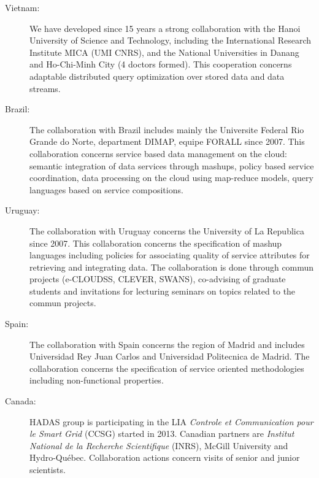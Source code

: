\begin{description}
\item[Vietnam:] We have developed since 15 years a strong collaboration with the Hanoi University of Science and Technology, including the International Research Institute MICA (UMI CNRS), and the National Universities in Danang and Ho-Chi-Minh City (4 doctors formed). This cooperation concerns adaptable distributed query optimization over stored data and data streams. 

\item[Brazil:] 
The collaboration with Brazil includes mainly the Universite Federal Rio Grande do Norte, department DIMAP,  equipe FORALL since 2007. This collaboration concerns service based data management on the cloud: semantic integration of data services through mashups, policy based service coordination, data processing on the cloud using map-reduce models, query languages based on service compositions.  

\item[Uruguay:] 
The collaboration with Uruguay concerns the University of La Republica since 2007. This collaboration concerns the specification of mashup languages including policies for associating quality of service attributes for retrieving and integrating data. The collaboration is done through commun projects (e-CLOUDSS, CLEVER, SWANS), co-advising of graduate students and invitations for lecturing seminars on topics related to the commun projects.

\item[Spain:] 
The collaboration with Spain concerns the region of Madrid and includes Universidad Rey Juan Carlos and Universidad Politecnica de Madrid. The collaboration concerns the specification of service oriented methodologies including non-functional properties. 

\item[Canada:]
HADAS group is participating in the LIA {\em Controle et Communication pour le Smart Grid} (CCSG) started in 2013. Canadian partners are {\em Institut National de la Recherche Scientifique} (INRS), McGill University and Hydro-Qu\'ebec. Collaboration actions concern visits of senior and junior scientists.

\end{description}


